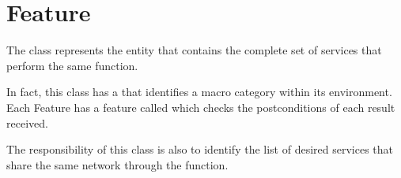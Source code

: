 \documentclass[a4paper,10pt,english,openany,oneside]{sphinxmanual}
\begin{document}
\section{Feature}
\label{\detokenize{code:feature}}
The  class represents the entity that contains the complete set of services that perform the same function.

In fact, this class has a  that identifies a macro category within its environment. Each Feature has a feature called  which
checks the postconditions of each result received.

The responsibility of this class is also to identify the list of desired services that share the same network through the  function.
\end{document}
